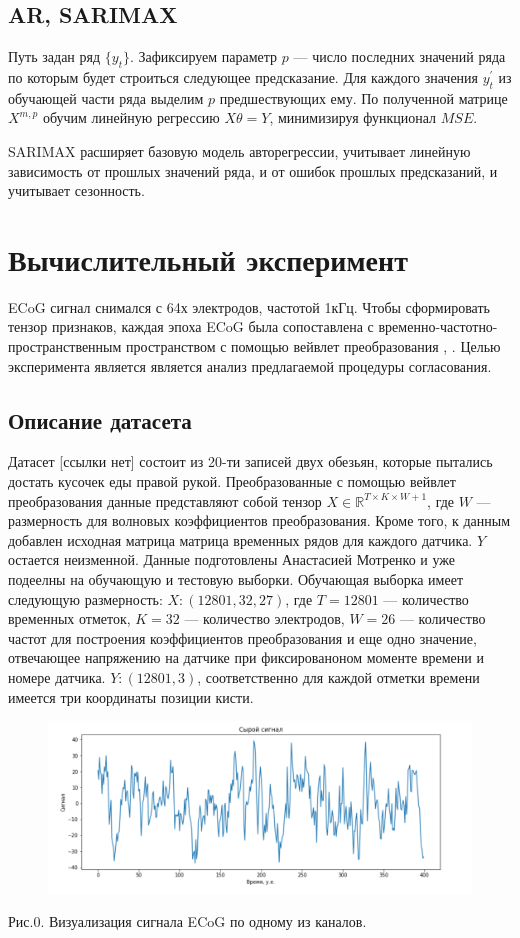 \documentclass{article}
\begin{document}
\subsection{AR, SARIMAX}

Путь задан ряд $\{y_t\}$. Зафиксируем параметр $p$ --- число последних значений ряда по которым будет строиться следующее предсказание. Для каждого значения $y_t^{'}$ из обучающей части ряда выделим $p$ предшествующих ему. По полученной матрице $X^{m, p}$ обучим линейную регрессию $X\theta = Y$, минимизируя функционал $MSE$.

\par
SARIMAX  \cite{7514029} расширяет базовую модель авторегрессии, учитывает линейную зависимость от прошлых значений ряда, и от ошибок  прошлых предсказаний, и учитывает сезонность.
 

\section{Вычислительный эксперимент}
ECoG сигнал снимался с 64х электродов, частотой 1кГц. Чтобы сформировать тензор признаков, каждая эпоха ECoG была сопоставлена с временно-частотно-пространственным пространством с помощью вейвлет преобразования \cite{eliseyev2016penalized}, \cite{chao2010long}. Целью эксперимента является является анализ предлагаемой процедуры согласования.
\subsection{Описание датасета}
Датасет [ссылки нет] состоит из 20-ти записей двух обезьян, которые пытались достать кусочек еды правой рукой. Преобразованные с помощью вейвлет преобразования данные представляют собой тензор $X \in \mathds{R}^{T \times K \times W+1}$, где $W$ --- размерность для волновых коэффициентов преобразования. Кроме того, к данным добавлен исходная матрица матрица временных рядов для каждого датчика. $Y$ остается неизменной. Данные подготовлены Анастасией Мотренко и уже подеелны на обучающую и тестовую выборки. Обучающая выборка имеет следующую размерность: $X:(12801, 32, 27)$, где $T = 12801$ --- количество временных отметок, $K = 32$ --- количество электродов, $W = 26$ --- количество частот для построения коэффициентов преобразования и еще одно значение, отвечающее напряжению на датчике при фиксированоном моменте времени и номере датчика. $Y:(12801, 3)$, соответственно для каждой отметки времени имеется три координаты позиции кисти. 
\begin{figure}[H]
\includegraphics[scale=0.5]{images/8.png}
\end{figure}
Рис.0. Визуализация сигнала ECoG по одному из каналов.
\end{document}
